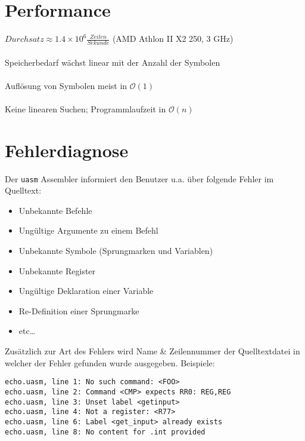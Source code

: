\section{Performance}

\begin{frame}[fragile]{\insertsection}
    $Durchsatz \approx 1.4 \times 10^6 \frac{Zeilen}{Sekunde}$
    (AMD Athlon II X2 250, 3 GHz) \\~\\
    Speicherbedarf wächst linear mit der Anzahl der Symbolen \\~\\
    Auflösung von Symbolen meist in $\mathcal{O}(1)$ \\~\\
    Keine linearen Suchen; Programmlaufzeit in $\mathcal{O}(n)$
\end{frame}

\section{Fehlerdiagnose}

\begin{frame}{\insertsection}
    Der \texttt{uasm} Assembler informiert den Benutzer u.a. über folgende
    Fehler im Quelltext:
    \begin{itemize}
        \item Unbekannte Befehle
        \item Ungültige Argumente zu einem Befehl
        \item Unbekannte Symbole (Sprungmarken und Variablen)
        \item Unbekannte Register
        \item Ungültige Deklaration einer Variable
        \item Re-Definition einer Sprungmarke
        \item etc\ldots{}
    \end{itemize}
\end{frame}

\begin{frame}[fragile]{\insertsection}
    Zusätzlich zur Art des Fehlers wird Name \& Zeilennummer der Quelltextdatei
    in welcher der Fehler gefunden wurde ausgegeben.\newline
    Beispiele:
\begin{verbatim}
echo.uasm, line 1: No such command: <FOO>
echo.uasm, line 2: Command <CMP> expects RR0: REG,REG
echo.uasm, line 3: Unset label <getinput>
echo.uasm, line 4: Not a register: <R77>
echo.uasm, line 6: Label <get_input> already exists
echo.uasm, line 8: No content for .int provided
\end{verbatim}
\end{frame}

